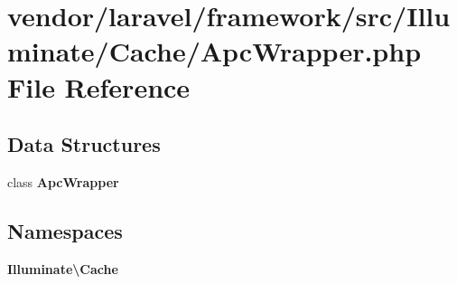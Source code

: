 \section{vendor/laravel/framework/src/\+Illuminate/\+Cache/\+Apc\+Wrapper.php File Reference}
\label{_apc_wrapper_8php}
\subsection*{Data Structures}
\begin{DoxyCompactItemize}
\item 
class {\bf Apc\+Wrapper}
\end{DoxyCompactItemize}
\subsection*{Namespaces}
\begin{DoxyCompactItemize}
\item 
 {\bf Illuminate\textbackslash{}\+Cache}
\end{DoxyCompactItemize}
